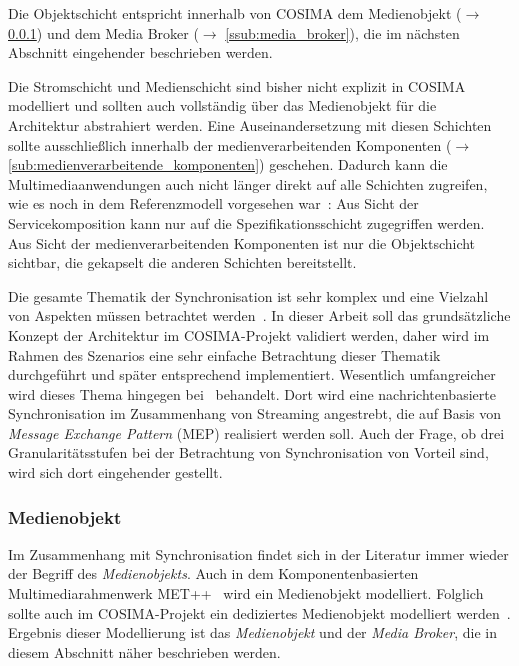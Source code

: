 
  Die Objektschicht entspricht innerhalb von COSIMA dem Medienobjekt ($\to$ \ref{ssub:medienobjekt}) und dem Media Broker ($\to$ \ref{ssub:media_broker}), die im nächsten Abschnitt eingehender beschrieben werden.
  
  Die Stromschicht und Medienschicht sind bisher nicht explizit in COSIMA modelliert und sollten auch vollständig über das Medienobjekt für die Architektur abstrahiert werden. Eine Auseinandersetzung mit diesen Schichten sollte ausschließlich innerhalb der medienverarbeitenden Komponenten ($\to$ \ref{sub:medienverarbeitende_komponenten}) geschehen. Dadurch kann die Multimediaanwendungen auch nicht länger direkt auf alle Schichten zugreifen, wie es noch in dem Referenzmodell vorgesehen war~\citep[S. 13]{blakowski1996mss}: Aus Sicht der Servicekomposition kann nur auf die Spezifikationsschicht zugegriffen werden. Aus Sicht der medienverarbeitenden Komponenten ist nur die Objektschicht sichtbar, die gekapselt die anderen Schichten bereitstellt.

  Die gesamte Thematik der Synchronisation ist sehr komplex und eine Vielzahl von Aspekten müssen betrachtet werden~\citep[S. 27ff]{bericht}. In dieser Arbeit soll das grundsätz\-liche Konzept der Architektur im COSIMA-Projekt validiert werden, daher wird im Rahmen des Szenarios eine sehr einfache Betrachtung dieser Thematik durchgeführt und später entsprechend implementiert. Wesentlich umfangreicher wird dieses Thema hingegen bei~\citep{antons09} behandelt. Dort wird eine nachrichtenbasierte Synchronisation im Zusammenhang von Streaming angestrebt, die auf Basis von \emph{Message Exchange Pattern} (MEP) realisiert werden soll. Auch der Frage, ob drei Granularitätsstufen bei der Betrachtung von Synchronisation von Vorteil sind, wird sich dort eingehender gestellt.


  
\subsubsection{Medienobjekt} %
\label{ssub:medienobjekt}

  Im Zusammenhang mit Synchronisation findet sich in der Literatur immer wieder der Begriff des \emph{Medienobjekts}. Auch in dem Komponentenbasierten Multimediarahmenwerk MET++~\citep{ackermann1994dai} wird ein Medienobjekt modelliert. Folglich sollte auch im COSIMA-Projekt ein dediziertes Medienobjekt modelliert werden~\citep{bericht}. Ergebnis dieser Modellierung ist das \emph{Medienobjekt} und der \emph{Media Broker}, die in diesem Abschnitt näher beschrieben werden.

